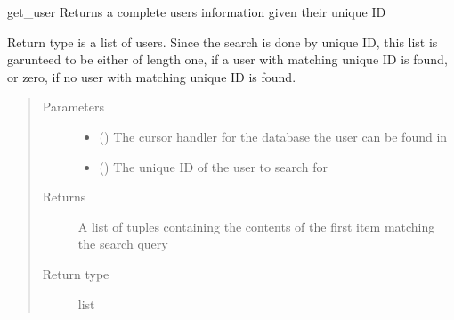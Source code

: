 \documentclass[letterpaper,10pt,english]{sphinxmanual}
\begin{document}
\begin{fulllineitems}
\label{\detokenize{index:data.database.get_user}}
get\_user Returns a complete users information given their unique ID

Return type is a list of users. Since the search is done by unique ID,
this list is garunteed to be either of length one, if a user with matching
unique ID is found, or zero, if no user with matching unique ID is found.
\begin{quote}\begin{description}
\item[{Parameters}] \leavevmode\begin{itemize}
\item {} 
 () \textendash{} The cursor handler for the database the user can be found in

\item {} 
 () \textendash{} The unique ID of the user to search for

\end{itemize}

\item[{Returns}] \leavevmode
A list of tuples containing the contents of the first item matching the search query

\item[{Return type}] \leavevmode
list

\end{description}\end{quote}

\end{fulllineitems}

\end{document}
